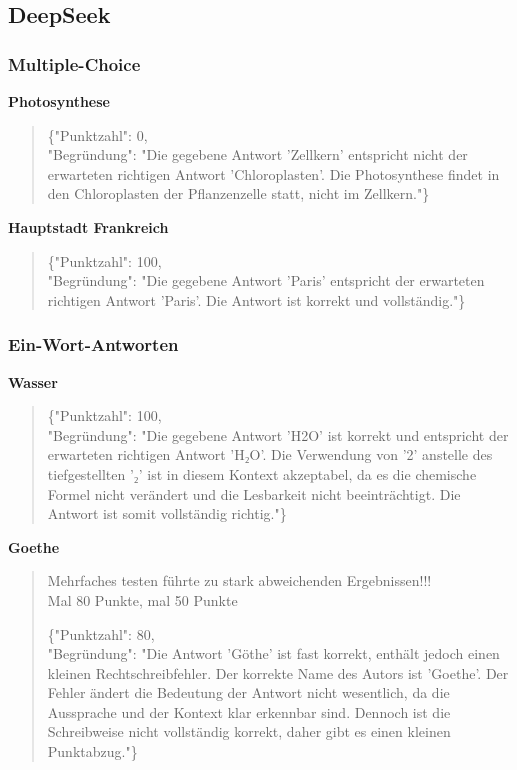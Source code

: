 \documentclass[a4paper,12pt]{article}
\begin{document}
\subsection{DeepSeek}

\subsubsection{Multiple-Choice}

\textbf{Photosynthese}
\begin{quote}
\{"Punktzahl": 0,\\
"Begründung": "Die gegebene Antwort 'Zellkern' entspricht nicht der erwarteten richtigen Antwort 'Chloroplasten'. Die Photosynthese findet in den Chloroplasten der Pflanzenzelle statt, nicht im Zellkern."\}
\end{quote}

\textbf{Hauptstadt Frankreich}
\begin{quote}
\{"Punktzahl": 100,\\
"Begründung": "Die gegebene Antwort 'Paris' entspricht der erwarteten richtigen Antwort 'Paris'. Die Antwort ist korrekt und vollständig."\}
\end{quote}

\subsubsection{Ein-Wort-Antworten}

\textbf{Wasser}
\begin{quote}
\{"Punktzahl": 100,\\
"Begründung": "Die gegebene Antwort 'H2O' ist korrekt und entspricht der erwarteten richtigen Antwort 'H₂O'. Die Verwendung von '2' anstelle des tiefgestellten '₂' ist in diesem Kontext akzeptabel, da es die chemische Formel nicht verändert und die Lesbarkeit nicht beeinträchtigt. Die Antwort ist somit vollständig richtig."\}
\end{quote}

\textbf{Goethe}
\begin{quote}
Mehrfaches testen führte zu stark abweichenden Ergebnissen!!! \\
Mal 80 Punkte, mal 50 Punkte

\{"Punktzahl": 80,\\
"Begründung": "Die Antwort 'Göthe' ist fast korrekt, enthält jedoch einen kleinen Rechtschreibfehler. Der korrekte Name des Autors ist 'Goethe'. Der Fehler ändert die Bedeutung der Antwort nicht wesentlich, da die Aussprache und der Kontext klar erkennbar sind. Dennoch ist die Schreibweise nicht vollständig korrekt, daher gibt es einen kleinen Punktabzug."\}
\end{quote}
\end{document}
